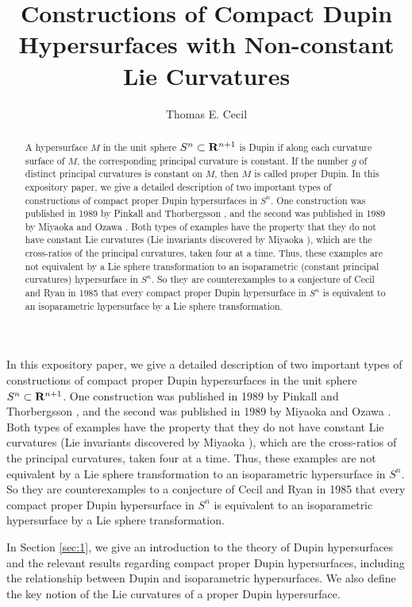 \documentclass[12pt]{article}
\begin{document}
\title
{\bf  Constructions of Compact Dupin Hypersurfaces with Non-constant Lie Curvatures}
\author
{Thomas E. Cecil}
\maketitle

\begin{abstract}
A hypersurface $M$ in the unit sphere $S^n \subset {\bf R}^{n+1}$ is Dupin if 
along each curvature surface of $M$, the corresponding principal curvature is constant.  If
the number $g$ of distinct principal curvatures is constant on $M$, then $M$ is called proper Dupin.
In this expository paper, we give a detailed description of two important types of constructions of compact proper Dupin hypersurfaces  in $S^n$. One construction was published in 1989 by Pinkall and Thorbergsson \cite{PT1}, and the second
was published in 1989 by Miyaoka and Ozawa \cite{MO}.  Both types of examples
have the property that they do not have constant Lie curvatures (Lie invariants discovered by Miyaoka \cite{Mi3}), which are the cross-ratios of the principal curvatures, taken four at a time.  Thus, these examples are not equivalent by a Lie sphere transformation to an isoparametric 
(constant principal curvatures) 
hypersurface in $S^n$.  So they are counterexamples to a conjecture of Cecil and Ryan \cite[p. 184]{CR7} in 1985
that every compact proper Dupin hypersurface 
in $S^n$ is equivalent to an isoparametric hypersurface by a Lie sphere transformation. 
\end{abstract}

\noindent
In this expository paper, we give a detailed description of two important types of constructions of compact proper Dupin hypersurfaces  in the unit sphere $S^n \subset {\bf R}^{n+1}$.  One construction was published in 1989 by Pinkall and Thorbergsson \cite{PT1}, and the second
was published in 1989 by Miyaoka and Ozawa \cite{MO}.   Both types of examples
have the property that they do not have constant Lie curvatures  (Lie invariants discovered by Miyaoka \cite{Mi3}), 
which are the cross-ratios of the principal curvatures, taken four at a time.  Thus, these examples are not equivalent by a Lie sphere transformation to an isoparametric 
hypersurface in $S^n$.  So they are counterexamples to a conjecture of Cecil and Ryan \cite[p. 184]{CR7} in 1985
that every compact proper Dupin hypersurface 
in $S^n$ is equivalent to an isoparametric hypersurface by a Lie sphere transformation. 


In Section \ref{sec:1}, we give an introduction to the theory of Dupin hypersurfaces and the relevant results regarding compact proper Dupin hypersurfaces, including the relationship between Dupin and isoparametric hypersurfaces.  We also define the key notion of the Lie curvatures of a proper Dupin hypersurface.
\end{document}
